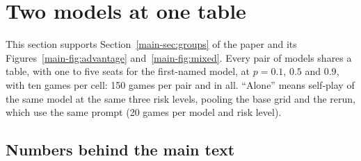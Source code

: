 \documentclass[10pt]{article}
\let\plainsubsection\subsection
\renewcommand{\subsection}{\FloatBarrier\needspace{8\baselineskip}\plainsubsection}
\let\plainsection\section
\renewcommand{\section}{\FloatBarrier\needspace{12\baselineskip}\plainsection}  %
\begin{document}
\section{Two models at one table}
\label{sec:mixed}

This section supports Section~\ref{main-sec:groups} of the paper and its Figures~\ref{main-fig:advantage} and~\ref{main-fig:mixed}. Every pair of models shares a table, with one to five seats for the first-named model, at $p=0.1$, $0.5$ and $0.9$, with ten games per cell: 150 games per pair and \MixGames{} in all. ``Alone'' means self-play of the same model at the same three risk levels, pooling the base grid and the rerun, which use the same prompt (20 games per model and risk level).

\subsection{Numbers behind the main text}
\end{document}
